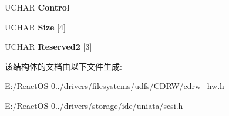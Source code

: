 \begin{DoxyCompactItemize}
\begin{tabbing}
\end{tabbing}\item 
\mbox{\label{struct___c_d_b_1_1___r_e_s_e_r_v_e___t_r_a_c_k_a3679a31091296258e33dd6f42a1c8b12}} 
U\+C\+H\+AR {\bfseries Control}
\item 
\mbox{\label{struct___c_d_b_1_1___r_e_s_e_r_v_e___t_r_a_c_k_ae107baaa05454b500d4ef52c1b35ca23}} 
U\+C\+H\+AR {\bfseries Size} \mbox{[}4\mbox{]}
\item 
\mbox{\label{struct___c_d_b_1_1___r_e_s_e_r_v_e___t_r_a_c_k_a289c6a5abb71acb970f2f378e2e8e3cf}} 
U\+C\+H\+AR {\bfseries Reserved2} \mbox{[}3\mbox{]}
\end{DoxyCompactItemize}


该结构体的文档由以下文件生成\+:\begin{DoxyCompactItemize}
\item 
E\+:/\+React\+O\+S-\/0../drivers/filesystems/udfs/\+C\+D\+R\+W/cdrw\+\_\+hw.\+h\item 
E\+:/\+React\+O\+S-\/0../drivers/storage/ide/uniata/scsi.\+h\end{DoxyCompactItemize}
